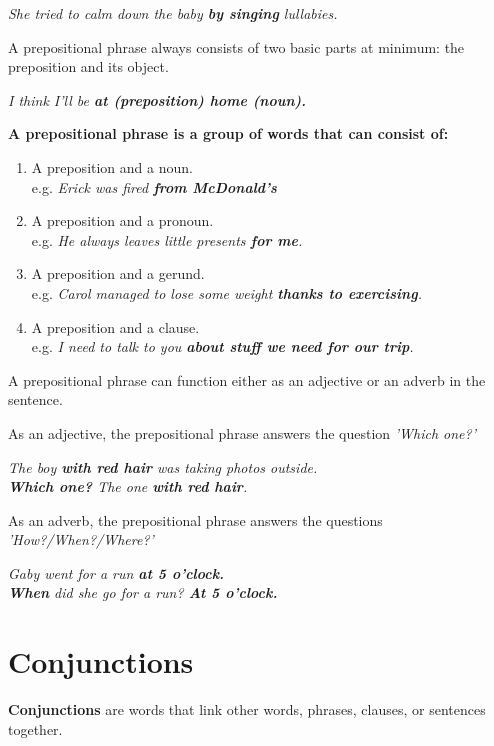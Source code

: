 \documentclass[hidelinks,10pt,a4paper]{article}
\begin{document}
\begin{center}
	\textit{She tried to calm down the baby \textbf{by singing} lullabies.}
\end{center}

A prepositional phrase always consists of two basic parts at minimum: the preposition and its object.

\begin{center}
	\textit{I think I'll be \textbf{at (preposition) home (noun).} }
\end{center}

\textbf{A prepositional phrase is a group of words that can consist of:}
\begin{enumerate}[label=(\alph*)]
	\item A preposition and a noun. \\
		e.g. \textit{Erick was fired \textbf{from McDonald's} }
	\item A preposition and a pronoun. \\
		e.g. \textit{He always leaves little presents \textbf{for me}. }
	\item A preposition and a gerund. \\
		e.g. \textit{Carol managed to lose some weight \textbf{thanks to exercising}. }
	\item A preposition and a clause. \\
		e.g. \textit{I need to talk to you \textbf{about stuff we need for our trip}. }
\end{enumerate}

A prepositional phrase can function either as an adjective or an adverb in the sentence.

As an adjective, the prepositional phrase answers the question \textit{'Which one?'}

\begin{center}
	\textit{The boy \textbf{with red hair} was taking photos outside. \\
	\textbf{Which one?} The one \textbf{with red hair}.  }
\end{center}

As an adverb, the prepositional phrase answers the questions \textit{'How?/When?/Where?'}

\begin{center}
	\textit{Gaby went for a run \textbf{at 5 o'clock.}\\
	\textbf{When} did she go for a run? \textbf{At 5 o'clock.} }
\end{center}

\section{Conjunctions}
\textbf{Conjunctions} are words that link other words, phrases, clauses, or sentences together.
\end{document}
